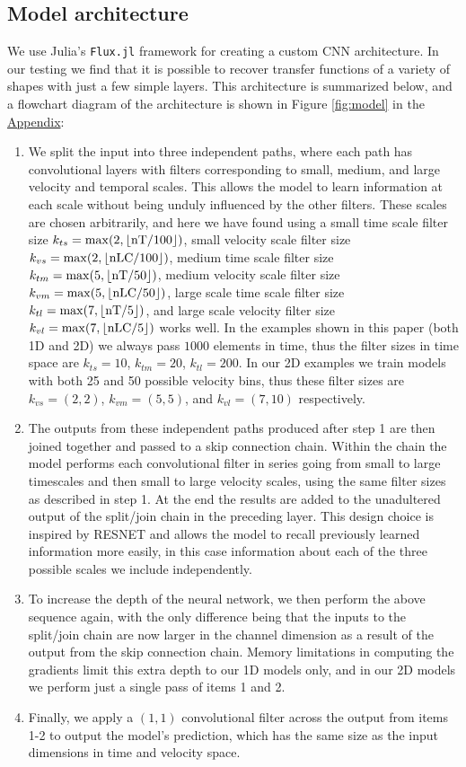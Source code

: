 \documentclass[floatfix,twocolumn,trackchanges,linenumbers]{aastex7}
\begin{document}
\subsection{Model architecture}
We use Julia's \texttt{Flux.jl} framework for creating a custom CNN architecture. In our testing we find that it is possible to recover transfer functions of a variety of shapes with just a few simple layers. This architecture is summarized below, and a flowchart diagram of the architecture is shown in Figure \ref{fig:model} in the \hyperref[appendix]{Appendix}:
\begin{enumerate}
    \item We split the input into three independent paths, where each path has convolutional layers with filters corresponding to small, medium, and large velocity and temporal scales. This allows the model to learn information at each scale without being unduly influenced by the other filters. These scales are chosen arbitrarily, and here we have found using a small time scale filter size $k_{ts} = \rm{max}(2, \lfloor nT/100\rfloor)$, small velocity scale filter size $k_{vs} = \rm{max} (2, \lfloor nLC/100\rfloor)$, medium time scale filter size $k_{tm} = \rm{max}(5, \lfloor nT/50\rfloor)$, medium velocity scale filter size $k_{vm} = \rm{max} (5, \lfloor nLC/50\rfloor)$, large scale time scale filter size $k_{tl} = \rm{max}(7, \lfloor nT/5\rfloor)$, and large scale velocity filter size $k_{vl} = \rm{max} (7, \lfloor nLC/5\rfloor)$ works well. In the examples shown in this paper (both 1D and 2D) we always pass $1000$ elements in time, thus the filter sizes in time space are $k_{ts} = 10$, $k_{tm} = 20$, $k_{tl} = 200$. In our 2D examples we train models with both 25 and 50 possible velocity bins, thus these filter sizes are $k_{vs} = (2,2)$, $k_{vm} = (5,5)$, and $k_{vl} = (7, 10)$ respectively.
    \item The outputs from these independent paths produced after step 1 are then joined together and passed to a skip connection chain. Within the chain the model performs each convolutional filter in series going from small to large timescales and then small to large velocity scales, using the same filter sizes as described in step 1. At the end the results are added to the unadultered output of the split/join chain in the preceding layer. This design choice is inspired by RESNET \citep{RESNET_2015} and allows the model to recall previously learned information more easily, in this case information about each of the three possible scales we include independently. 
    \item To increase the depth of the neural network, we then perform the above sequence again, with the only difference being that the inputs to the split/join chain are now larger in the channel dimension as a result of the output from the skip connection chain. Memory limitations in computing the gradients limit this extra depth to our 1D models only, and in our 2D models we perform just a single pass of items 1 and 2.
    \item Finally, we apply a $(1,1)$ convolutional filter across the output from items 1-2 to output the model's prediction, which has the same size as the input dimensions in time and velocity space.
\end{enumerate}
\end{document}
